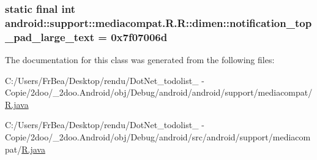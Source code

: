 \hypertarget{classandroid_1_1support_1_1mediacompat_1_1_r_1_1dimen_707b10105853c786ec8caf8e968d4eaa}{
\subsubsection[{notification\_\-top\_\-pad\_\-large\_\-text}]{\setlength{\rightskip}{0pt plus 5cm}static final int android::support::mediacompat.R.R::dimen::notification\_\-top\_\-pad\_\-large\_\-text = 0x7f07006d}}
\label{classandroid_1_1support_1_1mediacompat_1_1_r_1_1dimen_707b10105853c786ec8caf8e968d4eaa}




The documentation for this class was generated from the following files:\begin{CompactItemize}
\item 
C:/Users/FrBea/Desktop/rendu/DotNet\_\-todolist\_ - Copie/2doo/\_\-2doo.Android/obj/Debug/android/android/support/mediacompat/\hyperlink{android_2support_2mediacompat_2_r_8java}{R.java}\item 
C:/Users/FrBea/Desktop/rendu/DotNet\_\-todolist\_ - Copie/2doo/\_\-2doo.Android/obj/Debug/android/src/android/support/mediacompat/\hyperlink{src_2android_2support_2mediacompat_2_r_8java}{R.java}\end{CompactItemize}
